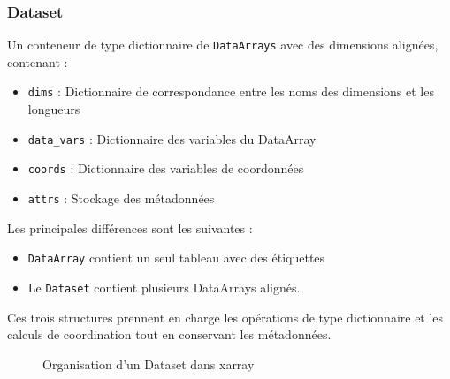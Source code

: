 \documentclass[
  11pt,
  letterpaper,
  open=any,
  twoside=false,
  french]{scrbook}
\begin{document}
\subsubsection{Dataset}\label{dataset}

Un conteneur de type dictionnaire de \texttt{DataArrays} avec des
dimensions alignées, contenant :

\begin{itemize}
\item
  \texttt{dims} : Dictionnaire de correspondance entre les noms des
  dimensions et les longueurs
\item
  \texttt{data\_vars} : Dictionnaire des variables du DataArray
\item
  \texttt{coords} : Dictionnaire des variables de coordonnées
\item
  \texttt{attrs} : Stockage des métadonnées
\end{itemize}

Les principales différences sont les suivantes :

\begin{itemize}
\item
  \texttt{DataArray} contient un seul tableau avec des étiquettes
\item
  Le \texttt{Dataset} contient plusieurs DataArrays alignés.
\end{itemize}

Ces trois structures prennent en charge les opérations de type
dictionnaire et les calculs de coordination tout en conservant les
métadonnées.

\begin{figure}


\caption{\label{fig-xarray}Organisation d'un Dataset dans xarray}

\end{figure}%
\end{document}
